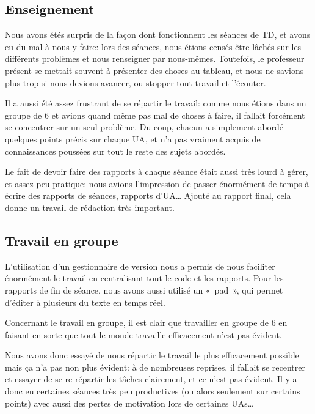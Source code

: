 
\subsection{Enseignement}

Nous avons étés surpris de la façon dont fonctionnent
les séances de TD, et avons eu du mal à nous y faire:
lors des séances, nous étions censés être lâchés sur les
différents problèmes et nous renseigner par nous-mêmes.
Toutefois, le professeur présent se mettait souvent à présenter
des choses au tableau, et nous ne savions plus trop si nous
devions avancer, ou stopper tout travail et l'écouter.

Il a aussi été assez frustrant de se répartir le travail:
comme nous étions dans un groupe de 6 et avions quand même
pas mal de choses à faire, il fallait forcément se concentrer
sur un seul problème. Du coup, chacun a simplement abordé
quelques points précis sur chaque UA, et n'a pas vraiment acquis de
connaissances poussées sur tout le reste des sujets abordés.

Le fait de devoir faire des rapports à chaque séance était aussi
très lourd à gérer, et assez peu pratique: nous avions l'impression
de passer énormément de temps à écrire des rapports de séances,
rapports d'UA\dots{} Ajouté au rapport final, cela donne un travail
de rédaction très important.

\subsection{Travail en groupe} %

L'utilisation d'un gestionnaire de version nous a permis de nous faciliter
énormément le travail en centralisant tout le code et les rapports.  Pour les
rapports de fin de séance, nous avons aussi utilisé un «~pad~», qui permet
d'éditer à plusieurs du texte en temps réel.

Concernant le travail en groupe, il est clair que travailler en groupe de 6
en faisant en sorte que tout le monde travaille efficacement n'est pas évident.

Nous avons donc essayé de nous répartir le travail le plus efficacement possible
mais ça n'a pas non plus évident: à de nombreuses reprises, il fallait se recentrer
et essayer de se re-répartir les tâches clairement, et ce n'est pas évident.
Il y a donc eu certaines séances très peu productives (ou alors seulement
sur certains points) avec aussi des pertes de motivation lors de certaines UAs\dots

